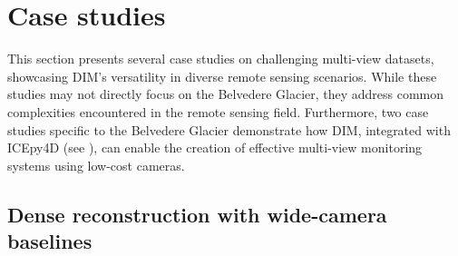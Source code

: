 
\section{Case studies}\label{sec:5:methods}


This section presents several case studies on challenging multi-view datasets, showcasing DIM's versatility in diverse remote sensing scenarios.
While these studies may not directly focus on the Belvedere Glacier, they address common complexities encountered in the remote sensing field.  
Furthermore, two case studies specific to the Belvedere Glacier demonstrate how DIM, integrated with ICEpy4D (see ), can enable the creation of effective multi-view monitoring systems using low-cost cameras.


\subsection{Dense reconstruction with wide-camera baselines}

